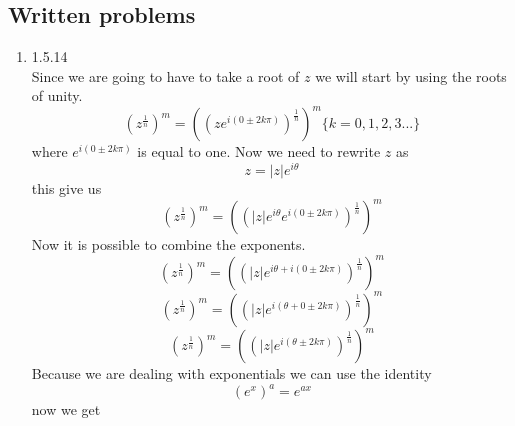 \documentclass[11pt]{article}
\begin{document}

\subsection*{Written problems}
\begin{enumerate}
\item 1.5.14\\
Since we are going to have to take a root of $z$ we will start by using the roots of unity.
$$\left(z^{\frac{1}{n}}\right)^m = \left(\left(z e^{i(0 \pm 2k\pi)}\right)^{\frac{1}{n}}\right)^m \{k = 0, 1, 2, 3... \}$$
where $e^{i(0 \pm 2k\pi)}$ is equal to one. Now we need to rewrite $z$ as
$$z = |z| e^{i\theta}$$
this give us
$$\left(z^{\frac{1}{n}}\right)^m = \left(\left(|z| e^{i\theta} e^{i(0 \pm 2k\pi)}\right)^{\frac{1}{n}}\right)^m$$
Now it is possible to combine the exponents.
$$\left(z^{\frac{1}{n}}\right)^m = \left(\left(|z| e^{i\theta + i(0 \pm 2k\pi)}\right)^{\frac{1}{n}}\right)^m$$
$$\left(z^{\frac{1}{n}}\right)^m = \left(\left(|z| e^{i(\theta + 0 \pm 2k\pi)}\right)^{\frac{1}{n}}\right)^m$$
$$\left(z^{\frac{1}{n}}\right)^m = \left(\left(|z| e^{i(\theta \pm 2k\pi)}\right)^{\frac{1}{n}}\right)^m$$
Because we are dealing with exponentials we can use the identity $$\left(e^{x}\right)^{a} = e^{ax}$$ now we get


\end{enumerate}
\end{document}
